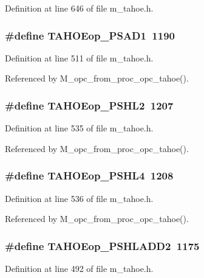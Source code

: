 Definition at line 646 of file m\_\-tahoe.h.
\subsubsection{\setlength{\rightskip}{0pt plus 5cm}\#define TAHOEop\_\-PSAD1~1190}\label{m__tahoe_8h_0a9d7d7a8f3cff1842203db45055e331}




Definition at line 511 of file m\_\-tahoe.h.

Referenced by M\_\-opc\_\-from\_\-proc\_\-opc\_\-tahoe().
\subsubsection{\setlength{\rightskip}{0pt plus 5cm}\#define TAHOEop\_\-PSHL2~1207}\label{m__tahoe_8h_47d8df3f569b76e0d3f63bebff792727}




Definition at line 535 of file m\_\-tahoe.h.

Referenced by M\_\-opc\_\-from\_\-proc\_\-opc\_\-tahoe().
\subsubsection{\setlength{\rightskip}{0pt plus 5cm}\#define TAHOEop\_\-PSHL4~1208}\label{m__tahoe_8h_33b1b6b006a56d021c733604210ecbb5}




Definition at line 536 of file m\_\-tahoe.h.

Referenced by M\_\-opc\_\-from\_\-proc\_\-opc\_\-tahoe().
\subsubsection{\setlength{\rightskip}{0pt plus 5cm}\#define TAHOEop\_\-PSHLADD2~1175}\label{m__tahoe_8h_bb9b4d25dd95ea019bca88ec09722584}




Definition at line 492 of file m\_\-tahoe.h.

